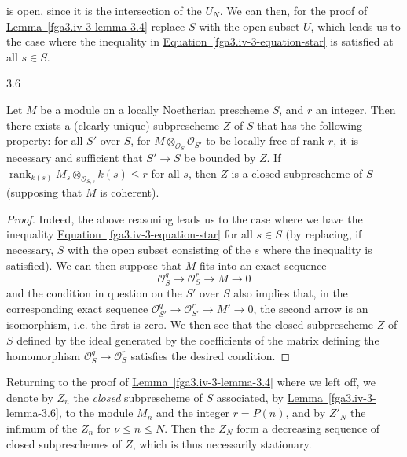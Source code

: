   is open, since it is the intersection of the \(U_N\).
  We can then, for the proof of \hyperref[fga3.iv-3-lemma-3.4]{Lemma~\ref*{fga3.iv-3-lemma-3.4}} replace \(S\) with the open subset \(U\), which leads us to the case where the inequality in \hyperref[fga3.iv-3-equation-star]{Equation~\ref*{fga3.iv-3-equation-star}} is satisfied at all \(s\in  S\).\begin{lemma}{3.6}\label{fga3.iv-3-lemma-3.6}\skipsinglepar\par{}Let \(M\) be a module on a locally Noetherian prescheme \(S\), and \(r\) an integer.
    Then there exists a (clearly unique) subprescheme \(Z\) of \(S\) that has the following property:
    for all \(S'\) over \(S\), for \(M\otimes _{\mathcal {O}_S}\mathcal {O}_{S'}\) to be locally free of rank \(r\), it is necessary and sufficient that \(S'\to  S\) be bounded by \(Z\).
    If \(\operatorname {rank}_{k(s)}M_s\otimes _{\mathcal {O}_{S,s}} k(s)\leqslant  r\) for all \(s\), then \(Z\) is a closed subprescheme of \(S\) (supposing that \(M\) is coherent).\begin{proof}\par{}Indeed, the above reasoning leads us to the case where we have the inequality \hyperref[fga3.iv-3-equation-star]{Equation~\ref*{fga3.iv-3-equation-star}} for all \(s\in  S\) (by replacing, if necessary, \(S\) with the open subset consisting of the \(s\) where the inequality is satisfied).
      We can then suppose that \(M\) fits into an exact sequence
      \[         \mathcal {O}_S^q \to  \mathcal {O}_S^r \to  M \to  0       \]
      and the condition in question on the \(S'\) over \(S\) also implies that, in the corresponding exact sequence \(\mathcal {O}_{S'}^q\to \mathcal {O}_{S'}^r\to  M'\to  0\), the second arrow is an isomorphism, i.e. the first is zero.
      We then see that the closed subprescheme \(Z\) of \(S\) defined by the ideal generated by the coefficients of the matrix defining the homomorphism \(\mathcal {O}_S^q\to \mathcal {O}_S^r\) satisfies the desired condition.\end{proof}\end{lemma}\par{}Returning to the proof of \hyperref[fga3.iv-3-lemma-3.4]{Lemma~\ref*{fga3.iv-3-lemma-3.4}} where we left off, we denote by \(Z_n\) the \emph{closed} subprescheme of \(S\) associated, by \hyperref[fga3.iv-3-lemma-3.6]{Lemma~\ref*{fga3.iv-3-lemma-3.6}}, to the module \(M_n\) and the integer \(r=P(n)\), and by \(Z'_N\) the infimum of the \(Z_n\) for \(\nu \leqslant  n\leqslant  N\).
  Then the \(Z_N\) form a decreasing sequence of closed subpreschemes of \(Z\), which is thus necessarily stationary.
